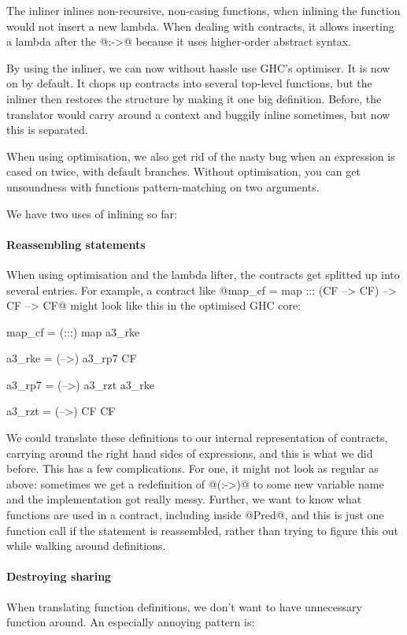 
The inliner inlines non-recursive, non-casing functions, when inlining
the function would not insert a new lambda.  When dealing with
contracts, it allows inserting a lambda after the @:->@ because it uses
higher-order abstract syntax.

By using the inliner, we can now without hassle use GHC's
optimiser. It is now on by default. It chops up contracts into several
top-level functions, but the inliner then restores the structure by
making it one big definition. Before, the translator would carry
around a context and buggily inline sometimes, but now this is
separated.

When using optimisation, we also get rid of the nasty bug when an expression
is cased on twice, with default branches. Without optimisation, you can get
unsoundness with functions pattern-matching on two arguments.

We have two uses of inlining so far:

\paragraph{Reassembling statements} When using optimisation and the
lambda lifter, the contracts get splitted up into several entries. For
example, a contract like @map_cf = map ::: (CF --> CF) --> CF --> CF@
might look like this in the optimised GHC core:

\begin{code}
map_cf = (:::) map a3_rke

a3_rke = (-->) a3_rp7 CF

a3_rp7 = (-->) a3_rzt a3_rke

a3_rzt = (-->) CF CF
\end{code}

We could translate these definitions to our internal representation of
contracts, carrying around the right hand sides of expressions, and
this is what we did before. This has a few complications. For one,
it might not look as regular as above: sometimes we get a redefinition
of @(:->)@ to some new variable name and the implementation got really
messy. Further, we want to know what functions are used in a contract,
including inside @Pred@, and this is just one function call if the
statement is reassembled, rather than trying to figure this out while
walking around definitions.

\paragraph{Destroying sharing}
When translating function definitions, we don't want to have
unnecessary function around. An especially annoying pattern is:

